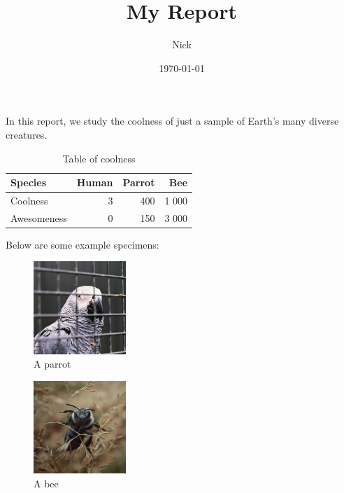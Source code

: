 \documentclass{article}
\title{My Report}
\author{Nick}
\date{\today}
\begin{document}
\maketitle

In this report, we study the coolness of just a sample of Earth's many diverse creatures.

\begin{table}[h]
    \centering
    \begin{tabular}{lrrr}
        \toprule
        \textbf{Species} & Human & Parrot & Bee \\
        \midrule
        Coolness         & 3     & 400    & 1 000 \\
        Awesomeness      & 0     & 150    & 3 000 \\
        \bottomrule
    \end{tabular}
    \caption{Table of coolness}
\end{table}

Below are some example specimens:

\begin{figure}[h]
    \centering
    \includegraphics[width=3.5cm]{parrot.jpg}
    \caption{A parrot}
\end{figure}

\begin{figure}[h]
    \centering
    \includegraphics[width=3.5cm]{bee.jpg}
    \caption{A bee}
\end{figure}
\end{document}

